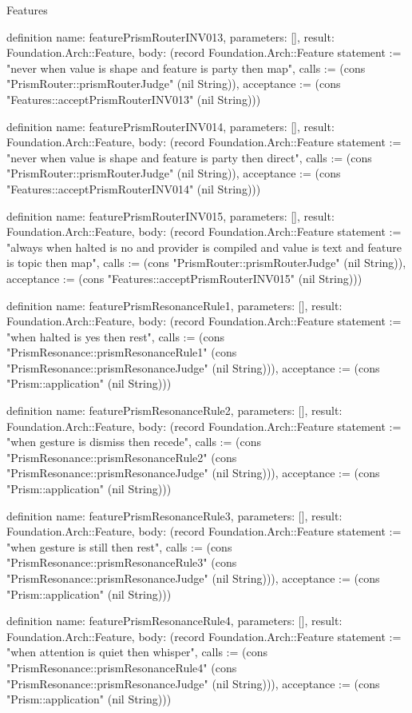 \begin{lexlean}{Features}
\begin{semanticmodule}
definition{
  name: featurePrismRouterINV013,
  parameters: [],
  result: Foundation.Arch::Feature,
  body: (record Foundation.Arch::Feature {statement := "never when value is shape and feature is party then map", calls := (cons "PrismRouter::prismRouterJudge" (nil String)), acceptance := (cons "Features::acceptPrismRouterINV013" (nil String))})
}

definition{
  name: featurePrismRouterINV014,
  parameters: [],
  result: Foundation.Arch::Feature,
  body: (record Foundation.Arch::Feature {statement := "never when value is shape and feature is party then direct", calls := (cons "PrismRouter::prismRouterJudge" (nil String)), acceptance := (cons "Features::acceptPrismRouterINV014" (nil String))})
}

definition{
  name: featurePrismRouterINV015,
  parameters: [],
  result: Foundation.Arch::Feature,
  body: (record Foundation.Arch::Feature {statement := "always when halted is no and provider is compiled and value is text and feature is topic then map", calls := (cons "PrismRouter::prismRouterJudge" (nil String)), acceptance := (cons "Features::acceptPrismRouterINV015" (nil String))})
}

definition{
  name: featurePrismResonanceRule1,
  parameters: [],
  result: Foundation.Arch::Feature,
  body: (record Foundation.Arch::Feature {statement := "when halted is yes then rest", calls := (cons "PrismResonance::prismResonanceRule1" (cons "PrismResonance::prismResonanceJudge" (nil String))), acceptance := (cons "Prism::application" (nil String))})
}

definition{
  name: featurePrismResonanceRule2,
  parameters: [],
  result: Foundation.Arch::Feature,
  body: (record Foundation.Arch::Feature {statement := "when gesture is dismiss then recede", calls := (cons "PrismResonance::prismResonanceRule2" (cons "PrismResonance::prismResonanceJudge" (nil String))), acceptance := (cons "Prism::application" (nil String))})
}

definition{
  name: featurePrismResonanceRule3,
  parameters: [],
  result: Foundation.Arch::Feature,
  body: (record Foundation.Arch::Feature {statement := "when gesture is still then rest", calls := (cons "PrismResonance::prismResonanceRule3" (cons "PrismResonance::prismResonanceJudge" (nil String))), acceptance := (cons "Prism::application" (nil String))})
}

definition{
  name: featurePrismResonanceRule4,
  parameters: [],
  result: Foundation.Arch::Feature,
  body: (record Foundation.Arch::Feature {statement := "when attention is quiet then whisper", calls := (cons "PrismResonance::prismResonanceRule4" (cons "PrismResonance::prismResonanceJudge" (nil String))), acceptance := (cons "Prism::application" (nil String))})
}


\end{semanticmodule}
\end{lexlean}

